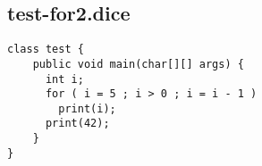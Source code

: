 \subsection{test-for2.dice}
\begin{verbatim}
class test {
	public void main(char[][] args) {
	  int i;
	  for ( i = 5 ; i > 0 ; i = i - 1 )
	    print(i); 
	  print(42);
	}
}

\end{verbatim}